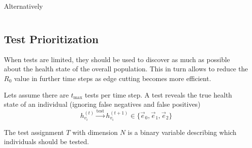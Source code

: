 \begin{equation}
\end{equation}
Alternatively

\begin{equation}
\end{equation}


\subsection{Test Prioritization}
When tests are limited, they should be used to discover as much as possible about the health state of the overall population.
This in turn allows to reduce the $R_0$ value in further time steps as edge cutting becomes more efficient.

Lets assume there are $t_{\text{max}}$ tests per time step.
A test reveals the true health state of an individual (ignoring false negatives and false positives)
\begin{equation}
h_{{v}_i}^{(t)} \xrightarrow{\text{test}} h_{{v}_i}^{(t+1)} \in \{\vec{e}_0, \vec{e}_1, \vec{e}_2 \}
\end{equation}

The test assignment $T$ with dimension $N$ is a binary variable describing which individuals should be tested.